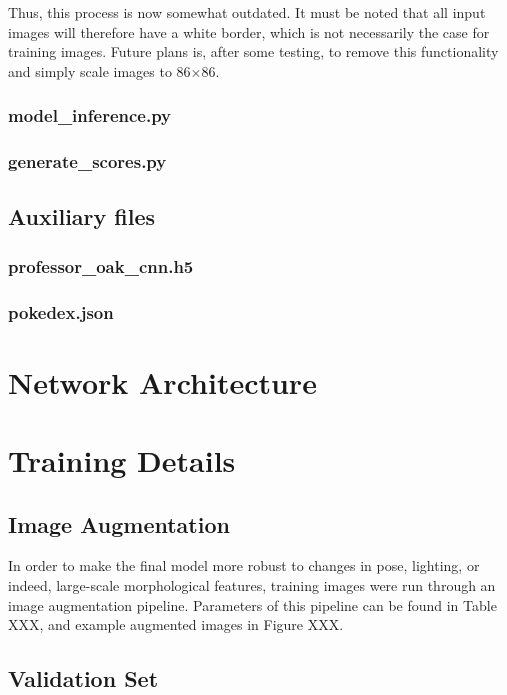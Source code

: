 \documentclass[onecolumn]{article}
\begin{document}
Thus, this process is now somewhat outdated. It must be noted that all input images will therefore have a white border, which is not necessarily the case for training images. Future plans is, after some testing, to remove this functionality and simply scale images to 86$\times$86.

\subsubsection*{model\_inference.py}

\subsubsection*{generate\_scores.py}

\subsection*{Auxiliary files}

\subsubsection*{professor\_oak\_cnn.h5}

\subsubsection*{pokedex.json}

\section*{Network Architecture}

\section*{Training Details}

\subsection*{Image Augmentation}

In order to make the final model more robust to changes in pose, lighting, or indeed, large-scale morphological features, training images were run through an image augmentation pipeline. Parameters of this pipeline can be found in Table XXX, and example augmented images in Figure XXX.

\subsection*{Validation Set}
\end{document}
